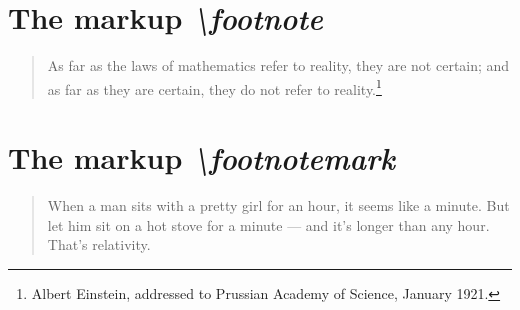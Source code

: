 \documentclass{article}
\begin{document}
\section*{The markup \emph{\textbackslash footnote}}

\begin{quotation}
As far as the laws of mathematics refer to reality, they are not certain; and as far as they are certain, they do not refer to reality.\footnote{Albert Einstein, addressed to Prussian Academy of Science, January 1921.}
\end{quotation}

\section*{The markup \emph{\textbackslash footnotemark}}

\begin{quotation}
When a man sits with a pretty girl for an hour, it seems like a minute. But let him sit on a hot stove for a minute — and it's longer than any hour. That's relativity.\footnotemark[10]
\end{quotation}

\end{document}
